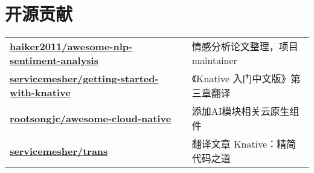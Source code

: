\documentclass[]{deedy-resume-openfont}
\begin{document}
\begin{minipage}[t]{0.68\textwidth}
\section{开源贡献}
\begin{tabular}{ll}
\href{https://github.com/haiker2011/awesome-nlp-sentiment-analysis/commits?author=haiker2011}{\bf haiker2011/awesome-nlp-sentiment-analysis} & 情感分析论文整理，项目 maintainer \\
\href{https://github.com/servicemesher/getting-started-with-knative/commits?author=haiker2011}{\bf servicemesher/getting-started-with-knative} & 《Knative 入门中文版》第三章翻译 \\
\href{https://github.com/rootsongjc/awesome-cloud-native/commits?author=haiker2011}{\bf rootsongjc/awesome-cloud-native} & 添加AI模块相关云原生组件 \\
\href{https://github.com/servicemesher/trans/commits?author=haiker2011}{\bf servicemesher/trans} & 翻译文章 Knative：精简代码之道 \\
\end{tabular}
\sectionsep





\end{minipage} 
\end{document}
